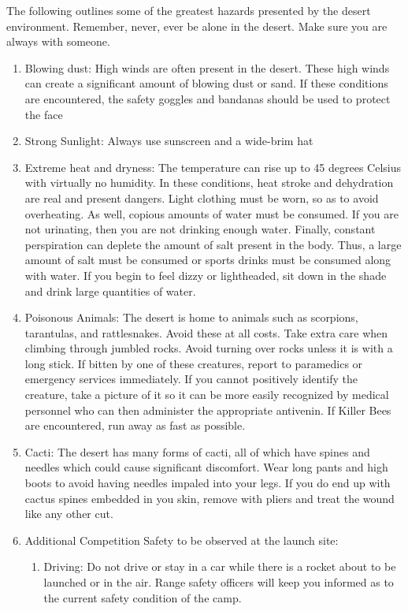    The following outlines some of the greatest hazards presented by the desert environment. Remember, never, ever be alone in the desert. Make sure you are always with someone.
    \begin{enumerate}
        \item Blowing dust: High winds are often present in the desert. These high winds can create a significant amount of blowing dust or sand. If these conditions are encountered, the safety goggles and bandanas should be used to protect the face
        \item Strong Sunlight: Always use sunscreen and a wide-brim hat
        \item Extreme heat and dryness: The temperature can rise up to 45 degrees Celsius with virtually no humidity. In these conditions, heat stroke and dehydration are real and present dangers. Light clothing must be worn, so as to avoid overheating. As well, copious amounts of water must be consumed. If you are not urinating, then you are not drinking enough water. Finally, constant perspiration can deplete the amount of salt present in the body. Thus, a large amount of salt must be consumed or sports drinks must be consumed along with water. If you begin to feel dizzy or lightheaded, sit down in the shade and drink large quantities of water.
        \item Poisonous Animals: The desert is home to animals such as scorpions, tarantulas, and rattlesnakes. Avoid these at all costs. Take extra care when climbing through jumbled rocks. Avoid turning over rocks unless it is with a long stick. If bitten by one of these creatures, report to paramedics or emergency services immediately. If you cannot positively identify the creature, take a picture of it so it can be more easily recognized by medical personnel who can then administer the appropriate antivenin. If Killer Bees are encountered, run away as fast as possible.
        \item Cacti: The desert has many forms of cacti, all of which have spines and needles which could cause significant discomfort. Wear long pants and high boots to avoid having needles impaled into your legs. If you do end up with cactus spines embedded in you skin, remove with pliers and treat the wound like any other cut.
        \item Additional Competition Safety to be observed at the launch site:
        \begin{enumerate}
            \item Driving: Do not drive or stay in a car while there is a rocket about to be launched or in the air. Range safety officers will keep you informed as to the current safety condition of the camp.

\end{enumerate}
\end{enumerate}
